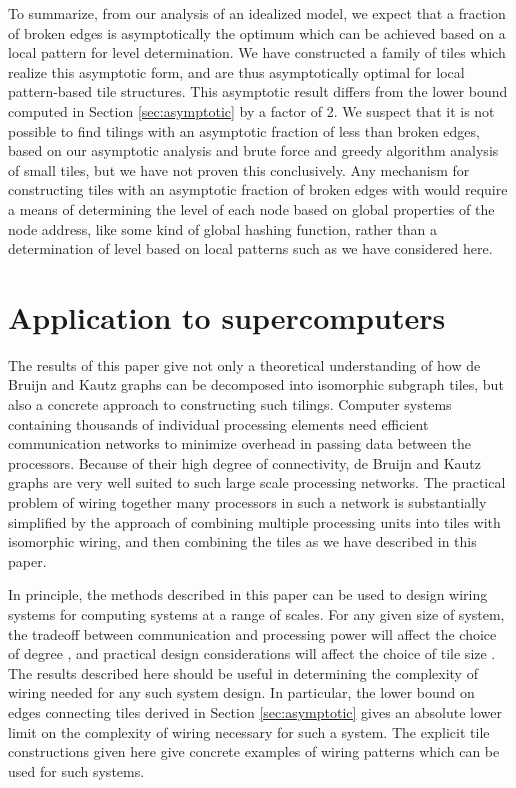 \documentclass[12pt]{article}
\begin{document}
To summarize, from our analysis of an idealized model, we expect that
a fraction of  broken edges is asymptotically the optimum which
can be achieved based on a local pattern for level determination.  We
have constructed a family of tiles which realize this asymptotic form,
and are thus asymptotically optimal for local pattern-based tile
structures.  This asymptotic result differs from the lower bound
computed in Section
\ref{sec:asymptotic} by a factor of 2.  We suspect that it is not possible to
find tilings with an asymptotic fraction of less than  broken
edges, based on our asymptotic analysis and brute force and greedy
algorithm analysis of small tiles, but we have not proven this
conclusively.  Any mechanism for constructing tiles with an asymptotic
fraction of  broken edges with  would require a means of
determining the level of each node based on global properties of the
 node address, like some kind of global hashing function, rather
than a determination of level based on local patterns such as we have
considered here.

\section{Application to supercomputers}

The results of this paper give not only a theoretical understanding of
how de Bruijn and Kautz graphs can be decomposed into isomorphic
subgraph tiles, but also a concrete approach to constructing such
tilings.  Computer systems containing thousands of individual
processing elements need efficient communication networks to minimize
overhead in passing data between the processors.  Because of their
high degree of connectivity, de Bruijn and Kautz graphs are very well
suited to such large scale processing networks.  The practical problem
of wiring together many processors in such a network is substantially
simplified by the approach of combining multiple processing units into
tiles with isomorphic wiring, and then combining the tiles as we have
described in this paper.

In principle, the methods described in this paper can be used to
design wiring systems for computing systems at a range of scales.  For
any given size of system, the tradeoff between communication and
processing power will affect the choice of degree , and practical
design considerations will affect the choice of tile size .  The
results described here should be useful in determining the complexity
of wiring needed for any such system design.  In particular, the lower
bound on edges connecting tiles derived in Section
\ref{sec:asymptotic} gives an absolute lower limit on the complexity
of wiring necessary for such a system.  The explicit tile
constructions given here give concrete examples of wiring patterns
which can be used for such systems.
\end{document}
